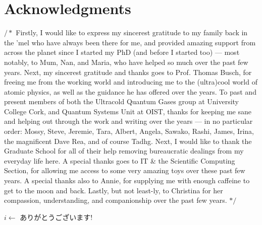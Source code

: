 \chapter*{Acknowledgments}

$/*$
Firstly, I would like to express my sincerest gratitude to my family back in the 'mel who have always been there for me, and provided amazing support from across the planet since I started my PhD (and before I started too) --- most notably, to Mum, Nan, and Maria, who have helped so much over the past few years. Next, my sincerest gratitude and thanks goes to Prof. Thomas Busch, for freeing me from the working world and introducing me to the (ultra)cool world of atomic physics, as well as the guidance he has offered over the years. To past and present members of both the Ultracold Quantum Gases group at University College Cork, and Quantum Systems Unit at OIST, thanks for keeping me sane and helping out through the work and writing over the years --- in no particular order: Mossy, Steve, Jeremie, Tara, Albert, Angela, Sawako, Rashi, James, Irina, the magnificent Dave Rea, and of course Tadhg. Next, I would like to thank the Graduate School for all of their help removing bureaucratic dealings from my everyday life here. A special thanks goes to IT \& the Scientific Computing Section, for allowing me access to some very amazing toys over these past few years. A special thanks also to Annie, for supplying me with enough caffeine to get to the moon and back. Lastly, but not least-ly, to Christina for her compassion, understanding, and companionship over the past few years. $*/$


\begin{algorithmic}
    \State $i\gets$ ありがとうございます!
\EndFor
\end{algorithmic}

